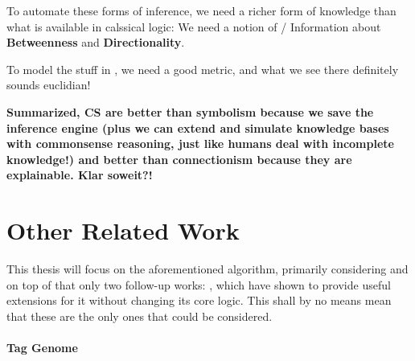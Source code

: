 To automate these forms of inference, we need a richer form of knowledge than what is available in calssical logic: We need a notion of / Information about \textbf{Betweenness} and \textbf{Directionality}.

To model the stuff in \autocite{fig:graphic_reasoning}, we need a good metric, and what we see there definitely sounds euclidian!

\textbf{Summarized, CS are better than symbolism because we save the inference engine (plus we can extend and simulate knowledge bases with commonsense reasoning, just like humans deal with incomplete knowledge!) and better than connectionism because they are explainable. Klar soweit?!}




\section{Other Related Work}
\label{sec:otherwork}

This thesis will focus on the aforementioned algorithm, primarily considering \cite{Derrac2015} and on top of that only two follow-up works: \cite{Ager2018, Alshaikh2020}, which have shown to provide useful extensions for it without changing its core logic. This shall by no means mean that these are the only ones that could be considered.

\paragraph{Tag Genome} 

